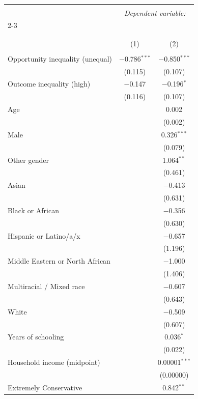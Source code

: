 
\begin{table}[H] \centering 
  \caption{} 
  \label{} 
\tiny 
\begin{tabular}{@{\extracolsep{5pt}}lcc} 
\\[-1.8ex]\hline 
\hline \\[-1.8ex] 
 & \multicolumn{2}{c}{\textit{Dependent variable:}} \\ 
\cline{2-3} 
\\[-1.8ex] & \multicolumn{2}{c}{} \\ 
\\[-1.8ex] & (1) & (2)\\ 
\hline \\[-1.8ex] 
 Opportunity inequality (unequal) & $-$0.786$^{***}$ & $-$0.850$^{***}$ \\ 
  & (0.115) & (0.107) \\ 
  Outcome inequality (high) & $-$0.147 & $-$0.196$^{*}$ \\ 
  & (0.116) & (0.107) \\ 
  Age &  & 0.002 \\ 
  &  & (0.002) \\ 
  Male &  & 0.326$^{***}$ \\ 
  &  & (0.079) \\ 
  Other gender &  & 1.064$^{**}$ \\ 
  &  & (0.461) \\ 
  Asian &  & $-$0.413 \\ 
  &  & (0.631) \\ 
  Black or African &  & $-$0.356 \\ 
  &  & (0.630) \\ 
  Hispanic or Latino/a/x &  & $-$0.657 \\ 
  &  & (1.196) \\ 
  Middle Eastern or North African &  & $-$1.000 \\ 
  &  & (1.406) \\ 
  Multiracial / Mixed race &  & $-$0.607 \\ 
  &  & (0.643) \\ 
  White &  & $-$0.509 \\ 
  &  & (0.607) \\ 
  Years of schooling &  & 0.036$^{*}$ \\ 
  &  & (0.022) \\ 
  Household income (midpoint) &  & 0.00001$^{***}$ \\ 
  &  & (0.00000) \\ 
  Extremely Conservative &  & 0.842$^{**}$ \\ 

\end{tabular}
\end{table}
